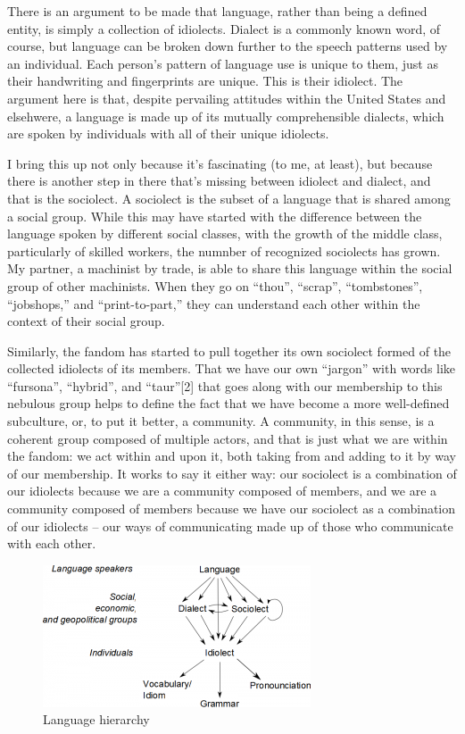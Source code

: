 There is an argument to be made that language, rather than being a defined entity, is simply a collection of idiolects. Dialect is a commonly known word, of course, but language can be broken down further to the speech patterns used by an individual. Each person's pattern of language use is unique to them, just as their handwriting and fingerprints are unique. This is their idiolect. The argument here is that, despite pervailing attitudes within the United States and elsehwere, a language is made up of its mutually comprehensible dialects, which are spoken by individuals with all of their unique idiolects.

I bring this up not only because it's fascinating (to me, at least), but because there is another step in there that's missing between idiolect and dialect, and that is the sociolect. A sociolect is the subset of a language that is shared among a social group. While this may have started with the difference between the language spoken by different social classes, with the growth of the middle class, particularly of skilled workers, the numnber of recognized sociolects has grown. My partner, a machinist by trade, is able to share this language within the social group of other machinists. When they go on ``thou'', ``scrap'', ``tombstones'', ``jobshops,'' and ``print-to-part,'' they can understand each other within the context of their social group.

Similarly, the fandom has started to pull together its own sociolect formed of the collected idiolects of its members. That we have our own ``jargon'' with words like ``fursona'', ``hybrid'', and ``taur''[2] that goes along with our membership to this nebulous group helps to define the fact that we have become a more well-defined subculture, or, to put it better, a community. A community, in this sense, is a coherent group composed of multiple actors, and that is just what we are within the fandom: we act within and upon it, both taking from and adding to it by way of our membership. It works to say it either way: our sociolect is a combination of our idiolects because we are a community composed of members, and we are a community composed of members because we have our sociolect as a combination of our idiolects -- our ways of communicating made up of those who communicate with each other.

\begin{figure}
  \begin{center}
    \includegraphics{content/assets/meaning--language-hierarchy}
  \end{center}
  \caption{Language hierarchy}
\end{figure}

